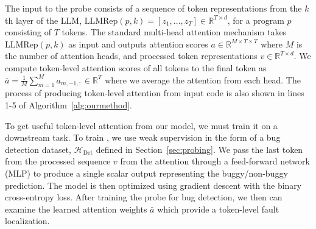 The input to the probe consists of a sequence of token representations from the $k$th layer of the LLM, $\text{LLMRep}(p, k) = [z_1,\dots, z_T]\in\mathbb{R}^{T\times d}$, for a program $p$ consisting of $T$ tokens. The standard multi-head attention mechanism takes $\text{LLMRep}(p, k)$ as input and outputs attention scores $a\in\mathbb{R}^{M\times T\times T}$ where $M$ is the number of attention heads, and processed token representations $v\in\mathbb{R}^{T\times d}$. We compute token-level attention scores of all tokens to the final token as $\bar{a} = \frac{1}{M}\sum_{m=1}^M a_{m,-1,:} \in\mathbb{R}^T$ where we average the attention from each head. The process of producing token-level attention from input code is also shown in lines 1-5 of Algorithm~\ref{alg:ourmethod}.


To get useful token-level attention from our model, we must train it on a downstream task. To train \ourmethod{}, we use weak supervision in the form of a bug detection dataset, $\mathcal{H}_\text{Det}$ defined in Section~\ref{sec:probing}. We pass the last token from the processed sequence $v$ from the attention through a feed-forward network (MLP) to produce a single scalar output representing the buggy/non-buggy prediction.
The model is then optimized using gradient descent with the binary cross-entropy loss.
After training the probe for bug detection, we then can examine the learned attention weights $\bar{a}$ which provide a token-level fault localization.


